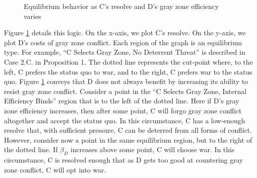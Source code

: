 \documentclass[bibtex, autowc]{apsr_submission}
\begin{document}
\begin{figure}[h]
    
    \caption{Equilibrium behavior as C's resolve and D's gray zone efficiency varies}
    \label{fig:equilibrium}
    \end{figure}

Figure \ref{fig:equilibrium} details this logic. On the x-axis, we plot C's resolve. On the y-axis, we plot D's costs of gray zone conflict. Each region of the graph is an equilibrium type. For example, ``C Selects Gray Zone, No Deterrent Threat'' is described in Case 2.C. in Proposition 1. The dotted line represents the cut-point where, to the left, C prefers the status quo to war, and to the right, C prefers war to the status quo. Figure \ref{fig:equilibrium} conveys that D does not always benefit by increasing its ability to resist gray zone conflict. Consider a point in the ``C Selects Gray Zone, Internal Efficiency Binds'' region that is to the left of the dotted line. Here if D's gray zone efficiency increases, then after some point, C will forgo gray zone conflict altogether and accept the status quo. In this circumstance, C has a low-enough resolve that, with sufficient pressure, C can be deterred from all forms of conflict. However, consider now a point in the same equilibrium region, but to the right of the dotted line. If $\beta_{D}$ increases above some point, C will choose war. In this circumstance, C is resolved enough that as D gets too good at countering gray zone conflict, C will opt into war. 
\end{document}
